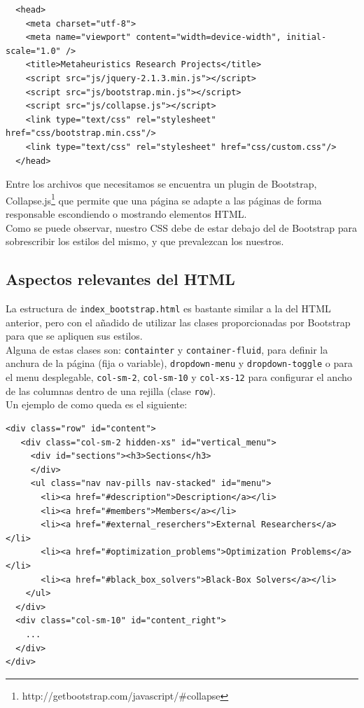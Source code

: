\documentclass[10pt,a4paper]{article}
\begin{document}
\begin{verbatim}
  <head>
    <meta charset="utf-8">
    <meta name="viewport" content="width=device-width", initial-scale="1.0" />
    <title>Metaheuristics Research Projects</title>
    <script src="js/jquery-2.1.3.min.js"></script>
    <script src="js/bootstrap.min.js"></script>
    <script src="js/collapse.js"></script>
    <link type="text/css" rel="stylesheet" href="css/bootstrap.min.css"/>
    <link type="text/css" rel="stylesheet" href="css/custom.css"/>
  </head>
\end{verbatim}

Entre los archivos que necesitamos se encuentra un plugin de Bootstrap, Collapse.js\footnote{http://getbootstrap.com/javascript/\#collapse} que permite que una página se adapte a las páginas de forma responsable escondiendo o mostrando elementos HTML.\\

Como se puede observar, nuestro CSS debe de estar debajo del de Bootstrap para sobrescribir los estilos del mismo, y que prevalezcan los nuestros.

\subsection{Aspectos relevantes del HTML}

La estructura de \texttt{index\_bootstrap.html} es bastante similar a la del HTML anterior, pero con el añadido de utilizar las clases proporcionadas por Bootstrap para que se apliquen sus estilos.\\

Alguna de estas clases son:  \texttt{containter} y  \texttt{container-fluid}, para definir la anchura de la página (fija o variable),  \texttt{dropdown-menu} y  \texttt{dropdown-toggle} o para el menu desplegable, \texttt{col-sm-2}, \texttt{col-sm-10} y \texttt{col-xs-12} para configurar el ancho de las columnas dentro de una rejilla (clase \texttt{row}).\\

Un ejemplo de como queda es el siguiente:\\

\begin{verbatim}
<div class="row" id="content">
   <div class="col-sm-2 hidden-xs" id="vertical_menu">
     <div id="sections"><h3>Sections</h3>
     </div>
     <ul class="nav nav-pills nav-stacked" id="menu">
       <li><a href="#description">Description</a></li>
       <li><a href="#members">Members</a></li>
       <li><a href="#external_reserchers">External Researchers</a></li>
       <li><a href="#optimization_problems">Optimization Problems</a></li>
       <li><a href="#black_box_solvers">Black-Box Solvers</a></li>
    </ul>
  </div>
  <div class="col-sm-10" id="content_right">
    ...
  </div>
</div> 
\end{verbatim}
\end{document}
